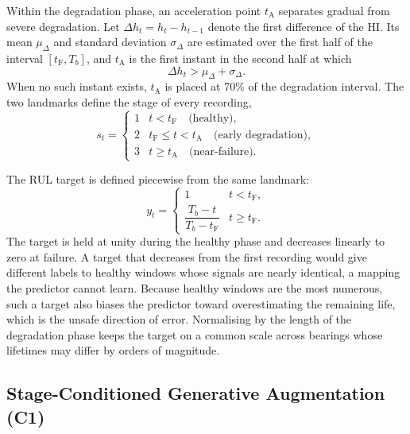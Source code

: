 Within the degradation phase, an acceleration point $t_{\mathrm{A}}$
separates gradual from severe degradation. Let
$\Delta h_t = h_t - h_{t-1}$ denote the first difference of the HI.
Its mean $\mu_\Delta$ and standard deviation $\sigma_\Delta$ are
estimated over the first half of the interval
$[t_{\mathrm{F}}, T_b]$, and $t_{\mathrm{A}}$ is the first instant in
the second half at which
\begin{equation}
  \Delta h_t > \mu_\Delta + \sigma_\Delta .
  \label{eq:acc_point}
\end{equation}
When no such instant exists, $t_{\mathrm{A}}$ is placed at 70\% of the
degradation interval. The two landmarks define the stage of every
recording,
\begin{equation}
  s_t =
  \begin{cases}
    1 & t < t_{\mathrm{F}} \quad \text{(healthy)},\\
    2 & t_{\mathrm{F}} \leq t < t_{\mathrm{A}}
        \quad \text{(early degradation)},\\
    3 & t \geq t_{\mathrm{A}} \quad \text{(near-failure)}.
  \end{cases}
  \label{eq:stages}
\end{equation}

The RUL target is defined piecewise from the same landmark:
\begin{equation}
  y_t =
  \begin{cases}
    1 & t < t_{\mathrm{F}},\\[2pt]
    \dfrac{T_b - t}{T_b - t_{\mathrm{F}}} & t \geq t_{\mathrm{F}}.
  \end{cases}
  \label{eq:rul_target}
\end{equation}
The target is held at unity during the healthy phase and decreases
linearly to zero at failure. A target that decreases from the first
recording would give different labels to healthy windows whose
signals are nearly identical, a mapping the predictor cannot learn.
Because healthy windows are the most numerous, such a target also
biases the predictor toward overestimating the remaining life, which
is the unsafe direction of error. Normalising by the length of the
degradation phase keeps the target on a common scale across bearings
whose lifetimes may differ by orders of magnitude.

\subsection{Stage-Conditioned Generative Augmentation (C1)}
\label{sec:c1_gan}

